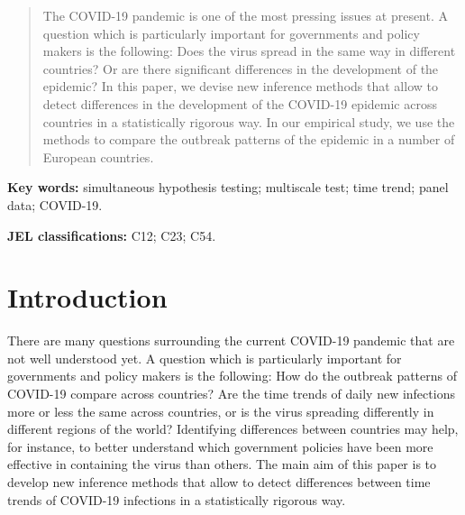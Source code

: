 \documentclass[a4paper,12pt]{article}
\numberwithin{equation}{section}
\begin{document}

\renewcommand{\thefootnote}{2}
\renewcommand{\thefootnote}{\arabic{footnote}}
\setcounter{footnote}{2}

\vspace{-0.7cm}

\renewcommand{\abstractname}{}
\begin{abstract}
\noindent The COVID-19 pandemic is one of the most pressing issues at present. A question which is particularly important for governments and policy makers is the following: Does the virus spread in the same way in different countries? Or are there significant differences in the development of the epidemic? In this paper, we devise new inference methods that allow to detect differences in the development of the COVID-19 epidemic across countries in a statistically rigorous way. In our empirical study, we use the methods to compare the outbreak patterns of the epidemic in a number of European countries.
\end{abstract}

\renewcommand{\baselinestretch}{1.2}\normalsize

\noindent \textbf{Key words:} simultaneous hypothesis testing; multiscale test; time trend; panel data; COVID-19.

\noindent \textbf{JEL classifications:} C12; C23; C54.




\section{Introduction}


There are many questions surrounding the current COVID-19 pandemic that are not well understood yet. A question which is particularly important for governments and policy makers is the following: How do the outbreak patterns of COVID-19 compare across countries? Are the time trends of daily new infections more or less the same across countries, or is the virus spreading differently in different regions of the world? Identifying differences between countries may help, for instance, to better understand which government policies have been more effective in containing the virus than others. The main aim of this paper is to develop new inference methods that allow to detect differences between time trends of COVID-19 infections in a statistically rigorous way.  
\end{document}
